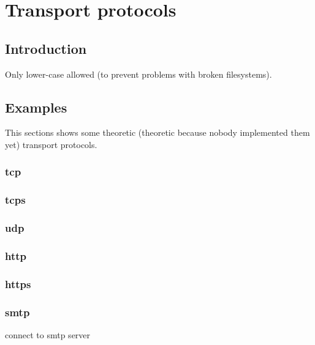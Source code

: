 \documentclass[12pt,a4paper]{book}
\begin{document}
\chapter{Transport protocols}
\section{Introduction}
Only lower-case allowed (to prevent problems with broken filesystems).
\section{Examples}
This sections shows some theoretic (theoretic because nobody implemented
them yet) transport protocols.
\subsection{tcp}
\subsection{tcps}
\subsection{udp}
\subsection{http}
\subsection{https}
\subsection{smtp}
connect to smtp server
\end{document}
